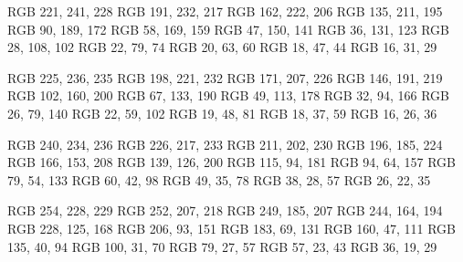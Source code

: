 \definecolor{cyan-50}  {RGB} {221, 241, 228}
\definecolor{cyan-100} {RGB} {191, 232, 217}
\definecolor{cyan-150} {RGB} {162, 222, 206}
\definecolor{cyan-200} {RGB} {135, 211, 195}
\definecolor{cyan-300} {RGB} {90, 189, 172}
\definecolor{cyan-400} {RGB} {58, 169, 159}
\definecolor{cyan-500} {RGB} {47, 150, 141}
\definecolor{cyan-600} {RGB} {36, 131, 123}
\definecolor{cyan-700} {RGB} {28, 108, 102}
\definecolor{cyan-800} {RGB} {22, 79, 74}
\definecolor{cyan-850} {RGB} {20, 63, 60}
\definecolor{cyan-900} {RGB} {18, 47, 44}
\definecolor{cyan-950} {RGB} {16, 31, 29}

\definecolor{blue-50}  {RGB} {225, 236, 235}
\definecolor{blue-100} {RGB} {198, 221, 232}
\definecolor{blue-150} {RGB} {171, 207, 226}
\definecolor{blue-200} {RGB} {146, 191, 219}
\definecolor{blue-300} {RGB} {102, 160, 200}
\definecolor{blue-400} {RGB} {67, 133, 190}
\definecolor{blue-500} {RGB} {49, 113, 178}
\definecolor{blue-600} {RGB} {32, 94, 166}
\definecolor{blue-700} {RGB} {26, 79, 140}
\definecolor{blue-800} {RGB} {22, 59, 102}
\definecolor{blue-850} {RGB} {19, 48, 81}
\definecolor{blue-900} {RGB} {18, 37, 59}
\definecolor{blue-950} {RGB} {16, 26, 36}

\definecolor{purple-50}  {RGB} {240, 234, 236}
\definecolor{purple-100} {RGB} {226, 217, 233}
\definecolor{purple-150} {RGB} {211, 202, 230}
\definecolor{purple-200} {RGB} {196, 185, 224}
\definecolor{purple-300} {RGB} {166, 153, 208}
\definecolor{purple-400} {RGB} {139, 126, 200}
\definecolor{purple-500} {RGB} {115, 94, 181}
\definecolor{purple-600} {RGB} {94, 64, 157}
\definecolor{purple-700} {RGB} {79, 54, 133}
\definecolor{purple-800} {RGB} {60, 42, 98}
\definecolor{purple-850} {RGB} {49, 35, 78}
\definecolor{purple-900} {RGB} {38, 28, 57}
\definecolor{purple-950} {RGB} {26, 22, 35}

\definecolor{magenta-50}  {RGB} {254, 228, 229}
\definecolor{magenta-100} {RGB} {252, 207, 218}
\definecolor{magenta-150} {RGB} {249, 185, 207}
\definecolor{magenta-200} {RGB} {244, 164, 194}
\definecolor{magenta-300} {RGB} {228, 125, 168}
\definecolor{magenta-400} {RGB} {206, 93, 151}
\definecolor{magenta-500} {RGB} {183, 69, 131}
\definecolor{magenta-600} {RGB} {160, 47, 111}
\definecolor{magenta-700} {RGB} {135, 40, 94}
\definecolor{magenta-800} {RGB} {100, 31, 70}
\definecolor{magenta-850} {RGB} {79, 27, 57}
\definecolor{magenta-900} {RGB} {57, 23, 43}
\definecolor{magenta-950} {RGB} {36, 19, 29}
